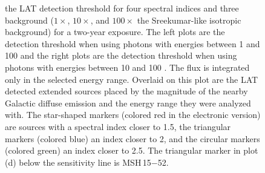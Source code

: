 \documentclass[12pt,preprint]{aastex}
\newif\ifcolorfigure
\newcommand{\gev}{\text{GeV}\xspace}
\begin{document}
\clearpage
\begin{figure}
    \ifcolorfigure
    \plotone{mc_plots/all_sensitivity_color.eps}
    \else
    \fi
    \caption{the LAT detection threshold for four spectral indices
    and three background ($1\times$, $10\times$, and $100\times$ the
    Sreekumar-like isotropic background) for a two-year exposure. The
    left plots are the detection threshold when using 
    photons with energies between
    1 \gev and 100 \gev
    and the right plots are the detection threshold when using
    photons with energies between
    10 \gev and 100 \gev.  The flux is integrated only in the
    selected energy range.  Overlaid on this plot are the LAT detected
    extended sources placed by the magnitude of the nearby Galactic
    diffuse emission and the energy range they were analyzed with.
    The star-shaped markers (colored red in the electronic version)
    are sources with a spectral index closer to 1.5, the triangular
    markers (colored blue) an index closer to 2, and the circular markers
    (colored green) an index closer to 2.5.  The triangular marker in plot
    (d) below the sensitivity line is MSH\,15$-$52.
    }\label{all_sensitivity} 
  \end{figure}
\end{document}
